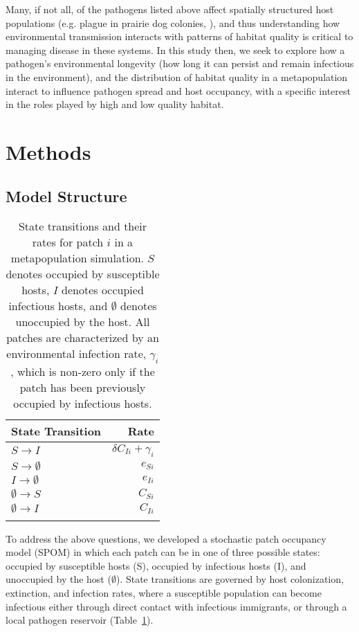 \documentclass{svjour3}
\begin{document}
Many, if not all, of the pathogens listed above affect spatially structured host populations (e.g. plague in prairie dog colonies, \cite{George2013}), and thus understanding how environmental transmission interacts with patterns of habitat quality is critical to managing disease in these systems.  In this study then, we seek to explore how a pathogen's environmental longevity (how long it can persist and remain infectious in the environment), and the distribution of habitat quality in a metapopulation interact to influence pathogen spread and host occupancy, with a specific interest in the roles played by high and low quality habitat.  

\section{Methods}
\label{methods}

\subsection{Model Structure}

\begin{table}
\caption{State transitions and their rates for patch $i$ in a metapopulation simulation.  $S$ denotes occupied by  susceptible hosts, $I$ denotes occupied infectious hosts, and $\emptyset$ denotes unoccupied by the host.  All patches are characterized by an environmental infection rate, $\gamma_i$, which is non-zero only if the patch has been previously occupied by infectious hosts.}
\begin{tabular}{lr}
State Transition & Rate \\
\hline
$S \rightarrow I$ & $\delta C_{Ii} + \gamma_i$\\
$S \rightarrow \emptyset $ & $e_{Si}$\\
$I \rightarrow \emptyset $ & $e_{Ii}$ \\
$\emptyset \rightarrow S$ & $C_{Si}$\\
$\emptyset \rightarrow I$ & $C_{Ii}$\\
\label{transitions}
\end{tabular}
\end{table}

To address the above questions, we developed a stochastic patch occupancy model (SPOM) in which each patch can be in one of three possible states: occupied by susceptible hosts (S), occupied by infectious hosts (I), and unoccupied by the host ($\emptyset$).  State transitions are governed by host colonization, extinction, and infection rates, where a susceptible population can become infectious either through direct contact with infectious immigrants, or through a local pathogen reservoir (Table~\ref{transitions}).
\end{document}
